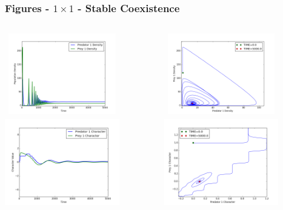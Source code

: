 \documentclass[10pt]{beamer}
\begin{document}
\begin{frame}
	\frametitle{Figures - $1\times1$ - Stable Coexistence}
	\begin{columns}[t]
		\begin{column}{.5\textwidth}
			\centering
			\includegraphics[width=5cm,height=3.5cm]{figures/1x1/variable_growth/stable_coexistence/densities.png}\\
			\includegraphics[width=5cm,height=4cm]{figures/1x1/variable_growth/stable_coexistence/traits.png}
		\end{column}
		\begin{column}{.5\textwidth}
			\centering
			\includegraphics[width=5cm,height=3.5cm]{figures/1x1/variable_growth/stable_coexistence/density_phase_plane.png}\\
			\includegraphics[width=5cm,height=4cm]{figures/1x1/variable_growth/stable_coexistence/trait_phase_plane.png}
		\end{column}
	\end{columns}
\end{frame}
\end{document}
